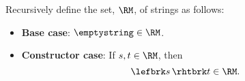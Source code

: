 \documentclass[handout]{mcs}
\begin{document}



\begin{definition*}
Recursively define the set, $\RM$, of strings as follows:
\begin{itemize}

\item \textbf{Base case}: $\emptystring \in\RM$.

\item \textbf{Constructor case}: If $s,t \in\RM$, then
\[
\lefbrk s\, \rhtbrk t \in\RM.
\]

\end{itemize}

\end{definition*}



\inhandout{\newpage}



\end{document}
